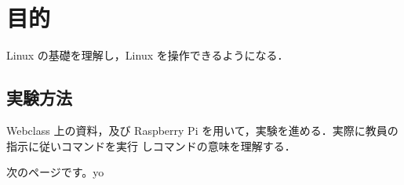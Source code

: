 \documentclass{myreport}  %
\begin{document}
\section{目的}
Linux の基礎を理解し，Linux を操作できるようになる．

\subsection{実験方法}
Webclass 上の資料，及び Raspberry Pi を用いて，実験を進める．実際に教員の指示に従いコマンドを実行
しコマンドの意味を理解する．

\newpage

次のページです。yo
\end{document}
